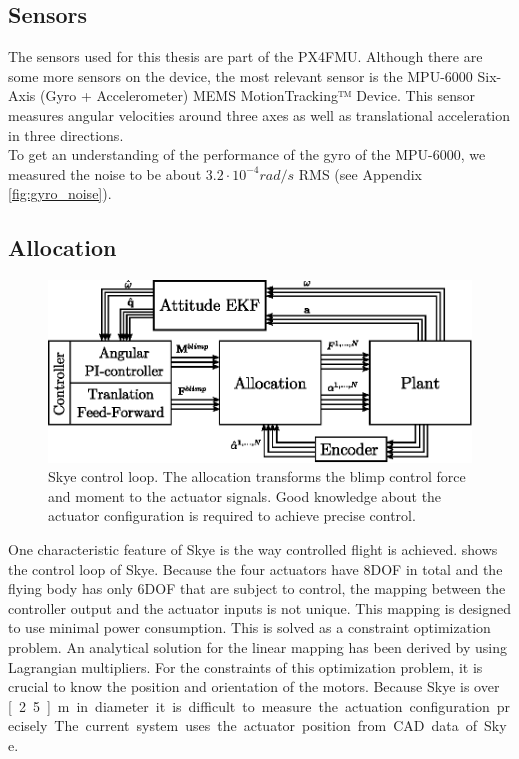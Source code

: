 \subsection{Sensors}
The sensors used for this thesis are part of the PX4FMU.
Although there are some more sensors on the device, the most relevant sensor is the MPU-6000 Six-Axis (Gyro + Accelerometer) MEMS MotionTracking™ Device.
This sensor measures angular velocities around three axes as well as translational acceleration in three directions. \\
To get an understanding of the performance of the gyro of the MPU-6000, we measured the noise to be about $3.2 \cdot 10^{-4}rad/s$ RMS (see Appendix \cref{fig:gyro_noise}).

\subsection{Allocation}

\begin{figure}[hbtp]
\captionsetup{width=0.9\textwidth}
\centering
\includegraphics[width=.9\linewidth]{images/intro/system_loop.eps}
\caption{Skye control loop. The allocation transforms the blimp control force and moment to the actuator signals. Good knowledge about the actuator configuration is required to achieve precise control.}
\label{fig:system_loop_3}
\end{figure}

One characteristic feature of Skye is the way controlled flight is achieved. 
 shows the control loop of Skye.
Because the four actuators have 8DOF in total and the flying body has only 6DOF that are subject to control,
the mapping between the controller output and the actuator inputs is not unique.
This mapping is designed to use minimal power consumption.
This is solved as a constraint optimization problem.
An analytical solution for the linear mapping has been derived by \citet{Schaffner2012} using Lagrangian multipliers.
For the constraints of this optimization problem, it is crucial to know the position and orientation of the motors.
Because Skye is over \unit[2.5]{m} in diameter it is difficult to measure the actuation configuration precisely.
The current system uses the actuator position from CAD data of Skye.


